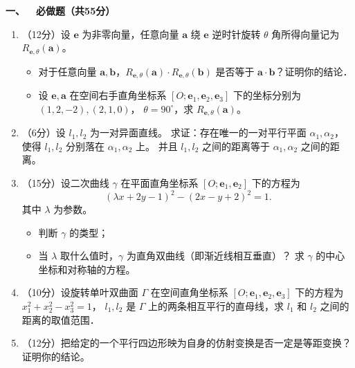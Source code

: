 \textbf{一、\ \ 必做题（共55分）}
\begin{enumerate}
\item（12分）设 $\mathbf{e}$ 为非零向量，任意向量 $\mathbf{a}$ 绕 $\mathbf{e}$ 逆时针旋转 $\theta$ 角所得向量记为 $R_{\mathbf{e}, \theta}(\mathbf{a})$。
\begin{itemize}
\item[(a)] 对于任意向量 $\mathbf{a}, \mathbf{b}$，$R_{\mathbf{e}, \theta}(\mathbf{a}) \cdot R_{\mathbf{e}, \theta}(\mathbf{b})$ 是否等于 $\mathbf{a} \cdot \mathbf{b}$？证明你的结论．
\item[(b)] 设 $\mathbf{e}, \mathbf{a}$ 在空间右手直角坐标系 $[O ; \mathbf{e}_{1}, \mathbf{e}_{2}, \mathbf{e}_{3}]$ 下的坐标分别为 $(1,2,-2),(2,1,0)$，
$\theta=90^{\circ}$，求 $R_{\mathbf{e}, \theta}(\mathbf{a})$。
\end{itemize}
\item（6分）设 $l_{1}, l_{2}$ 为一对异面直线。
求证：存在唯一的一对平行平面 $\alpha_{1}, \alpha_{2}$，
使得 $l_{1}, l_{2}$ 分别落在 $\alpha_{1}, \alpha_{2}$ 上。
并且 $l_{1}, l_{2}$ 之间的距离等于 $\alpha_{1}, \alpha_{2}$ 之间的距离。
\item（15分）设二次曲线 $\gamma$ 在平面直角坐标系 $[O ; \mathbf{e}_{1}, \mathbf{e}_{2}]$ 下的方程为
$$(\lambda x+2 y-1)^{2}-(2 x-y+2)^{2}=1.$$
其中 $\lambda$ 为参数。
\begin{itemize}
\item[(a)] 判断 $\gamma$ 的类型；
\item[(b)] 当 $\lambda$ 取什么值时，$\gamma$ 为直角双曲线（即渐近线相互垂直）？
求 $\gamma$ 的中心坐标和对称轴的方程。
\end{itemize}
\item（10分）设旋转单叶双曲面 $\Gamma$ 在空间直角坐标系 $\left[O ; \mathbf{e}_{1}, \mathbf{e}_{2}, \mathbf{e}_{3}\right]$ 下的方程为 $x_{1}^{2}+x_{2}^{2}-x_{3}^{2}=1$，
$l_{1}, l_{2}$ 是 $\Gamma$ 上的两条相互平行的直母线，求 $l_{1}$ 和 $l_{2}$ 之间的距离的取值范围．

\item（12分）把给定的一个平行四边形映为自身的仿射变换是否一定是等距变换？证明你的结论。
\end{enumerate}

